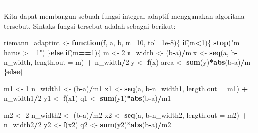 \documentclass[
]{book}
\newenvironment{Shaded}{\begin{snugshade}}{\end{snugshade}}
\newcommand{\AttributeTok}[1]{\textcolor[rgb]{0.13,0.29,0.53}{#1}}
\newcommand{\ControlFlowTok}[1]{\textcolor[rgb]{0.13,0.29,0.53}{\textbf{#1}}}
\newcommand{\DecValTok}[1]{\textcolor[rgb]{0.00,0.00,0.81}{#1}}
\newcommand{\FloatTok}[1]{\textcolor[rgb]{0.00,0.00,0.81}{#1}}
\newcommand{\FunctionTok}[1]{\textcolor[rgb]{0.13,0.29,0.53}{\textbf{#1}}}
\newcommand{\NormalTok}[1]{#1}
\newcommand{\OtherTok}[1]{\textcolor[rgb]{0.56,0.35,0.01}{#1}}
\newcommand{\SpecialCharTok}[1]{\textcolor[rgb]{0.81,0.36,0.00}{\textbf{#1}}}
\newcommand{\StringTok}[1]{\textcolor[rgb]{0.31,0.60,0.02}{#1}}
\theoremstyle{definition}
\theoremstyle{definition}
\theoremstyle{definition}
\theoremstyle{definition}
\theoremstyle{remark}
\begin{document}
\begin{center}\rule{0.5\linewidth}{0.5pt}\end{center}

Kita dapat membangun sebuah fungsi integral adaptif menggunakan algoritma tersebut. Sintaks fungsi tersebut adalah sebagai berikut:

\begin{Shaded}
\begin{Highlighting}[]
\NormalTok{riemann\_adaptint }\OtherTok{\textless{}{-}} \ControlFlowTok{function}\NormalTok{(f, a, b, }\AttributeTok{m=}\DecValTok{10}\NormalTok{, }\AttributeTok{tol=}\FloatTok{1e{-}8}\NormalTok{)\{}
  \ControlFlowTok{if}\NormalTok{(m}\SpecialCharTok{\textless{}}\DecValTok{1}\NormalTok{)\{}
    \FunctionTok{stop}\NormalTok{(}\StringTok{"m harus \textgreater{}= 1"}\NormalTok{)}
\NormalTok{  \}}\ControlFlowTok{else} \ControlFlowTok{if}\NormalTok{(m}\SpecialCharTok{==}\DecValTok{1}\NormalTok{)\{}
\NormalTok{    m }\OtherTok{\textless{}{-}} \DecValTok{2}
\NormalTok{    n\_width }\OtherTok{\textless{}{-}}\NormalTok{ (b}\SpecialCharTok{{-}}\NormalTok{a)}\SpecialCharTok{/}\NormalTok{m}
\NormalTok{    x }\OtherTok{\textless{}{-}} \FunctionTok{seq}\NormalTok{(a, b}\SpecialCharTok{{-}}\NormalTok{n\_width, }\AttributeTok{length.out =}\NormalTok{ m) }\SpecialCharTok{+}\NormalTok{ n\_width}\SpecialCharTok{/}\DecValTok{2}
\NormalTok{    y }\OtherTok{\textless{}{-}} \FunctionTok{f}\NormalTok{(x)}
\NormalTok{    area }\OtherTok{\textless{}{-}} \FunctionTok{sum}\NormalTok{(y)}\SpecialCharTok{*}\FunctionTok{abs}\NormalTok{(b}\SpecialCharTok{{-}}\NormalTok{a)}\SpecialCharTok{/}\NormalTok{m}
\NormalTok{  \}}\ControlFlowTok{else}\NormalTok{\{}
    
\NormalTok{    m1 }\OtherTok{\textless{}{-}} \DecValTok{1}
\NormalTok{    n\_width1 }\OtherTok{\textless{}{-}}\NormalTok{ (b}\SpecialCharTok{{-}}\NormalTok{a)}\SpecialCharTok{/}\NormalTok{m1}
\NormalTok{    x1 }\OtherTok{\textless{}{-}} \FunctionTok{seq}\NormalTok{(a, b}\SpecialCharTok{{-}}\NormalTok{n\_width1, }\AttributeTok{length.out =}\NormalTok{ m1) }\SpecialCharTok{+}\NormalTok{ n\_width1}\SpecialCharTok{/}\DecValTok{2}
\NormalTok{    y1 }\OtherTok{\textless{}{-}} \FunctionTok{f}\NormalTok{(x1)}
\NormalTok{    q1 }\OtherTok{\textless{}{-}} \FunctionTok{sum}\NormalTok{(y1)}\SpecialCharTok{*}\FunctionTok{abs}\NormalTok{(b}\SpecialCharTok{{-}}\NormalTok{a)}\SpecialCharTok{/}\NormalTok{m1}
    
\NormalTok{    m2 }\OtherTok{\textless{}{-}} \DecValTok{2}
\NormalTok{    n\_width2 }\OtherTok{\textless{}{-}}\NormalTok{ (b}\SpecialCharTok{{-}}\NormalTok{a)}\SpecialCharTok{/}\NormalTok{m2}
\NormalTok{    x2 }\OtherTok{\textless{}{-}} \FunctionTok{seq}\NormalTok{(a, b}\SpecialCharTok{{-}}\NormalTok{n\_width2, }\AttributeTok{length.out =}\NormalTok{ m2) }\SpecialCharTok{+}\NormalTok{ n\_width2}\SpecialCharTok{/}\DecValTok{2}
\NormalTok{    y2 }\OtherTok{\textless{}{-}} \FunctionTok{f}\NormalTok{(x2)}
\NormalTok{    q2 }\OtherTok{\textless{}{-}} \FunctionTok{sum}\NormalTok{(y2)}\SpecialCharTok{*}\FunctionTok{abs}\NormalTok{(b}\SpecialCharTok{{-}}\NormalTok{a)}\SpecialCharTok{/}\NormalTok{m2}
    

\end{Highlighting}
\end{Shaded}
\end{document}
